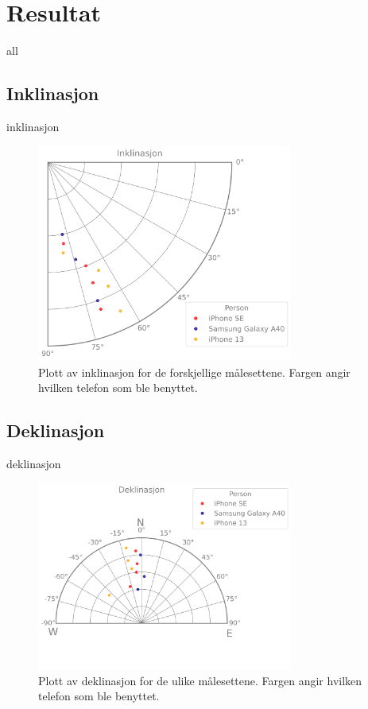 \section{Resultat}

{all}

\subsection{Inklinasjon}

{inklinasjon}

\begin{figure}
    \centering
    \includegraphics[width=0.75\textwidth]{Plots/inclination.png}
    \caption{Plott av inklinasjon for de forskjellige målesettene. Fargen angir hvilken telefon som ble benyttet.}
    
    \label{fig:plot_inklination}
\end{figure}


\subsection{Deklinasjon}

{deklinasjon}

\begin{figure}
    \centering
    \includegraphics[width=0.75\textwidth]{Plots/declination.png}
    \caption{Plott av deklinasjon for de ulike målesettene. Fargen angir hvilken telefon som ble benyttet.}
    \label{fig:plot_declination}
\end{figure}